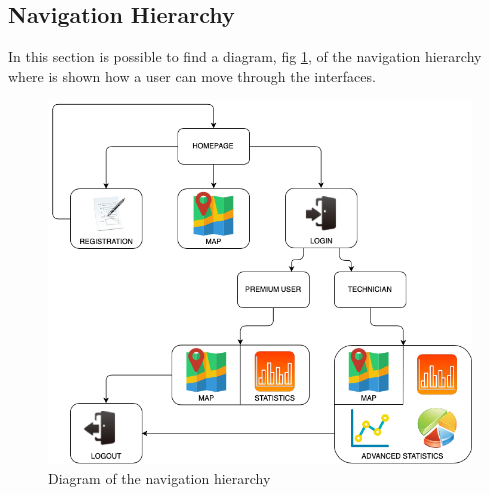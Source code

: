 \documentclass{article}
\begin{document}
\subsection{Navigation Hierarchy}
In this section is possible to find a diagram, fig \ref{fig:navigation}, of the navigation hierarchy where is shown how a user can move through the interfaces.\\
\begin{figure}[H]
    \centering
    \includegraphics[width=1\linewidth]{image/USERFLOW.png}
    \caption{Diagram of the navigation hierarchy}
    \label{fig:navigation}
\end{figure}
\end{document}

